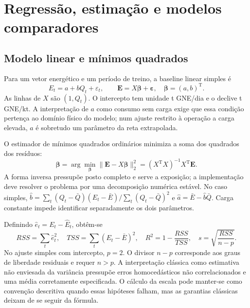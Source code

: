 
\section{Regressão, estimação e modelos comparadores}
\label{sec:mat-regressao}

\subsection{Modelo linear e mínimos quadrados}
\label{sec:mat-ols}
Para um vetor energético e um período de treino, a baseline linear simples é
\begin{equation}
E_t=a+bQ_t+\varepsilon_t,
\qquad \boldsymbol E=X\boldsymbol\beta+\boldsymbol\varepsilon,
\quad \boldsymbol\beta=(a,b)^{\mathrm T}.
\label{eq:mat-modelo-linear}
\end{equation}
As linhas de $X$ são $(1,Q_t)$. O intercepto tem unidade t GNE/dia e o declive t GNE/kt. A interpretação de $a$ como consumo sem carga exige que essa condição pertença ao domínio físico do modelo; num ajuste restrito à operação a carga elevada, $a$ é sobretudo um parâmetro da reta extrapolada.

O estimador de mínimos quadrados ordinários minimiza a soma dos quadrados dos resíduos:
\begin{equation}
\widehat{\boldsymbol\beta}
=\arg\min_{\boldsymbol\beta}\|\boldsymbol E-X\boldsymbol\beta\|_2^2
=(X^{\mathrm T}X)^{-1}X^{\mathrm T}\boldsymbol E.
\label{eq:mat-ols}
\end{equation}
A forma inversa pressupõe posto completo e serve a exposição; a implementação deve resolver o problema por uma decomposição numérica estável. No caso simples, $\widehat b=\sum_t(Q_t-\bar Q)(E_t-\bar E)/\sum_t(Q_t-\bar Q)^2$ e $\widehat a=\bar E-\widehat b\bar Q$. Carga constante impede identificar separadamente os dois parâmetros.

Definindo $\widehat e_t=E_t-\widehat E_t$, obtêm-se
\begin{equation}
RSS=\sum_t\widehat e_t^2,
\quad TSS=\sum_t(E_t-\bar E)^2,
\quad R^2=1-\frac{RSS}{TSS},
\quad s=\sqrt{\frac{RSS}{n-p}}.
\label{eq:mat-rss-escala}
\end{equation}
No ajuste simples com intercepto, $p=2$. O divisor $n-p$ corresponde aos graus de liberdade residuais e requer $n>p$. A interpretação clássica como estimativa não enviesada da variância pressupõe erros homocedásticos não correlacionados e uma média corretamente especificada. O cálculo da escala pode manter-se como convenção descritiva quando essas hipóteses falham, mas as garantias clássicas deixam de se seguir da fórmula.

